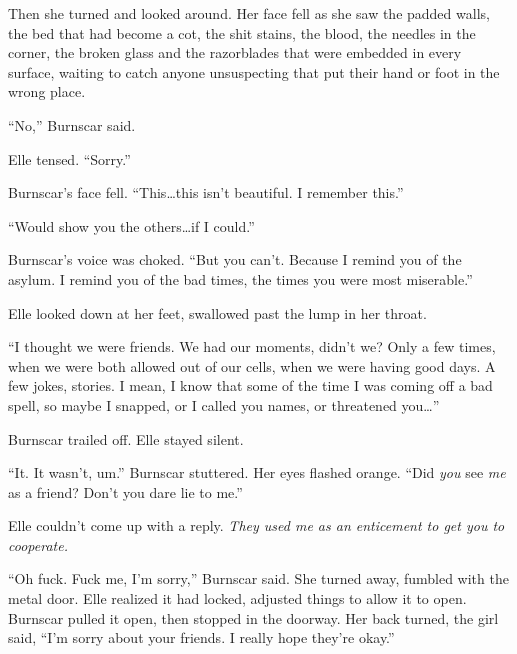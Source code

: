 Then she turned and looked around.  Her face fell as she saw the padded walls, the bed that had become a cot, the shit stains, the blood, the needles in the corner, the broken glass and the razorblades that were embedded in every surface, waiting to catch anyone unsuspecting that put their hand or foot in the wrong place.



``No,'' Burnscar said.



Elle tensed.  ``Sorry.''



Burnscar's face fell.  ``This\ldots this isn't beautiful.  I remember this.''



``Would show you the others\ldots if I could.''



Burnscar's voice was choked.  ``But you can't.  Because I remind you of the asylum.  I remind you of the bad times, the times you were most miserable.''



Elle looked down at her feet, swallowed past the lump in her throat.



``I thought we were friends.  We had our moments, didn't we?  Only a few times, when we were both allowed out of our cells, when we were having good days.  A few jokes, stories.  I mean, I know that some of the time I was coming off a bad spell, so maybe I snapped, or I called you names, or threatened you\ldots''



Burnscar trailed off.  Elle stayed silent.



``It.  It wasn't, um.'' Burnscar stuttered.  Her eyes flashed orange.  ``Did \emph{you} see \emph{me} as a friend?  Don't you dare lie to me.''



Elle couldn't come up with a reply.  \emph{They used me as an enticement to get you to cooperate.}



``Oh fuck.  Fuck me, I'm sorry,'' Burnscar said.  She turned away, fumbled with the metal door.  Elle realized it had locked, adjusted things to allow it to open.  Burnscar pulled it open, then stopped in the doorway.  Her back turned, the girl said, ``I'm sorry about your friends.  I really hope they're okay.''



